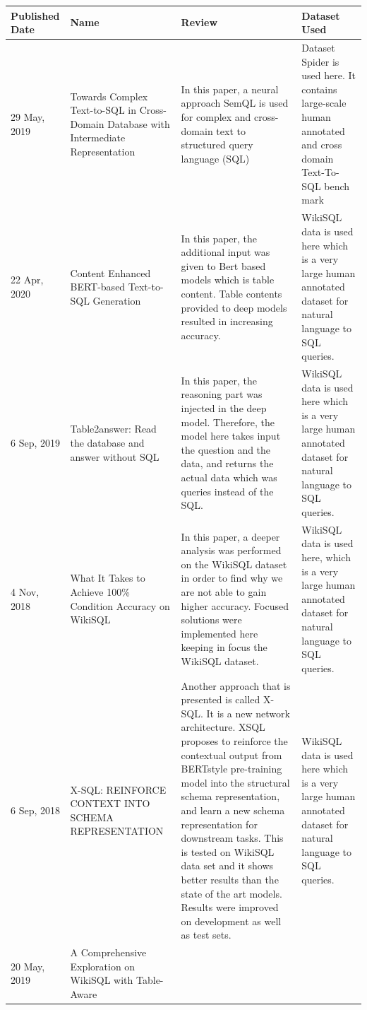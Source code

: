 \documentclass[12pt]{article}
\begin{document}
 \begin{longtable}{| m{2cm} | m{4cm}| m{5cm} |m{4cm}|} 
 \hline
Published Date & Name & Review & Dataset Used \\ 
 \hline\hline
  29 May, 2019 & Towards Complex
Text-to-SQL in
Cross-Domain
Database with
Intermediate
Representation & In this paper, a neural
approach SemQL is used for
complex and cross-domain
text to structured query
language (SQL) &Dataset Spider is used here. It
contains large-scale human
annotated and cross domain
Text-To-SQL bench mark  \\ 
  
  22 Apr, 2020 & Content Enhanced
BERT-based
Text-to-SQL
Generation & In this paper, the additional
input was given to Bert based
models which is table content.
Table contents provided to
deep models resulted in
increasing accuracy. & WikiSQL data is used here which
is a very large human annotated
dataset for natural language to
SQL queries.  \\ 
  6 Sep, 2019 &Table2answer: Read
the database
and answer without
SQL &In this paper, the reasoning
part was injected in the deep
model. Therefore, the model
here takes input the question
and the data, and returns the
actual data which was queries
instead of the SQL. &WikiSQL data is used here which
is a very large human annotated
dataset for natural language to
SQL queries.  \\ 
  4 Nov, 2018 & What It Takes to
Achieve 100\%
Condition Accuracy
on WikiSQL & In this paper, a deeper analysis
was performed on the
WikiSQL dataset in order to
find why we are not able to
gain higher accuracy. Focused
solutions were implemented
here keeping in focus the
WikiSQL dataset. &WikiSQL data is used here, which
is a very large human annotated
dataset for natural language to
SQL queries.  \\ 
  6 Sep, 2018 &X-SQL: REINFORCE
CONTEXT INTO
SCHEMA
REPRESENTATION & Another approach that is
presented is called X-SQL. It is
a new network architecture. XSQL proposes to reinforce the contextual output from BERTstyle pre-training model into
the structural schema
representation, and learn a
new schema representation
for downstream tasks. This is
tested on WikiSQL data set
and it shows better results
than the state of the art
models. Results were
improved on development as
well as test sets. & WikiSQL data is used here which
is a very large human annotated
dataset for natural language to
SQL queries.  \\ 
  20 May, 2019 &A Comprehensive
Exploration on
WikiSQL
with Table-Aware

\end{longtable}
\end{document}
